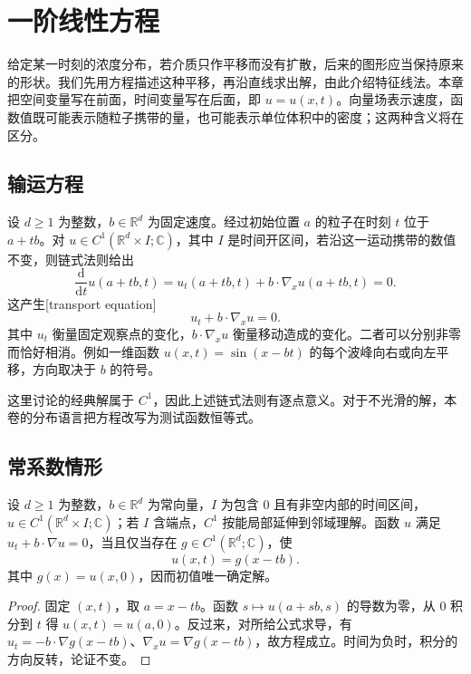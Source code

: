 \section{一阶线性方程}
\label{b2:sec:0701}

给定某一时刻的浓度分布，若介质只作平移而没有扩散，后来的图形应当保持原来的形状。我们先用方程描述这种平移，再沿直线求出解，由此介绍特征线法。本章把空间变量写在前面，时间变量写在后面，即 \(u=u(x,t)\)。向量场表示速度，函数值既可能表示随粒子携带的量，也可能表示单位体积中的密度；这两种含义将在区分。

\subsection{输运方程}
\label{b2:subsec:070101}

设 \(d\geq1\) 为整数，\(b\in\mathbb R^d\) 为固定速度。经过初始位置 \(a\) 的粒子在时刻 \(t\) 位于 \(a+tb\)。对 \(u\in C^1(\mathbb R^d\times I;\mathbb C)\)，其中 \(I\) 是时间开区间，若沿这一运动携带的数值不变，则链式法则给出
\[
 \frac{\mathrm d}{\mathrm dt}u(a+tb,t)
 =u_t(a+tb,t)+b\cdot\nabla_xu(a+tb,t)=0.
\]
这产生[transport equation]
\begin{equation}\label{b2:eq:07-constant-transport}
 u_t+b\cdot\nabla_xu=0.
\end{equation}
其中 \(u_t\) 衡量固定观察点的变化，\(b\cdot\nabla_xu\) 衡量移动造成的变化。二者可以分别非零而恰好相消。例如一维函数 \(u(x,t)=\sin(x-bt)\) 的每个波峰向右或向左平移，方向取决于 \(b\) 的符号。

\ProseParagraphBreak

这里讨论的经典解属于 \(C^1\)，因此上述链式法则有逐点意义。对于不光滑的解，本卷的分布语言把方程改写为测试函数恒等式。

\subsection{常系数情形}
\label{b2:subsec:070102}

\begin{proposition}\label{b2:prop:07-translation-solution}
设 \(d\geq1\) 为整数，\(b\in\mathbb R^d\) 为常向量，\(I\) 为包含 \(0\) 且有非空内部的时间区间，\(u\in C^1(\mathbb R^d\times I;\mathbb C)\)；若 \(I\) 含端点，\(C^1\) 按能局部延伸到邻域理解。函数 \(u\) 满足 \(u_t+b\cdot\nabla u=0\)，当且仅当存在 \(g\in C^1(\mathbb R^d;\mathbb C)\)，使
\[
 u(x,t)=g(x-tb).
\]
其中 \(g(x)=u(x,0)\)，因而初值唯一确定解。
\end{proposition}
\begin{proof}
固定 \((x,t)\)，取 \(a=x-tb\)。函数 \(s\mapsto u(a+sb,s)\) 的导数为零，从 \(0\) 积分到 \(t\) 得 \(u(x,t)=u(a,0)\)。反过来，对所给公式求导，有 \(u_t=-b\cdot\nabla g(x-tb)\)、\(\nabla_xu=\nabla g(x-tb)\)，故方程成立。时间为负时，积分的方向反转，论证不变。
\end{proof}

